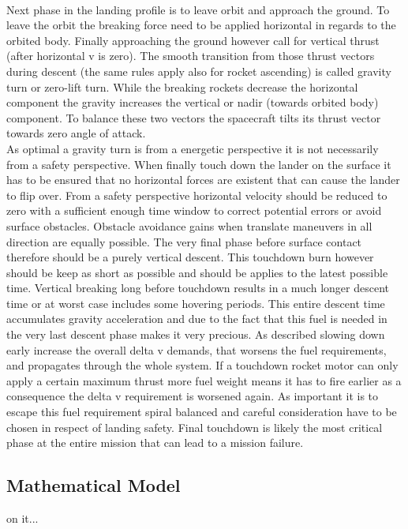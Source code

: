 \\
Next phase in the landing profile is to leave orbit and approach the ground. To leave the orbit the breaking force need to be applied horizontal in regards to the orbited body. Finally approaching the ground however call for vertical thrust (after horizontal v is zero). The smooth transition from those thrust vectors during descent (the same rules apply also for rocket ascending)  is called gravity turn or zero-lift turn. While the breaking rockets decrease the horizontal component the gravity increases the vertical or nadir (towards orbited body) component. To balance these two vectors the spacecraft tilts its thrust vector towards zero angle of attack.\\
As optimal a gravity turn is from a energetic perspective it is not necessarily from a safety perspective. When finally touch down the lander on the surface it has to be ensured that no horizontal forces are existent that can cause the lander to flip over. From a safety perspective horizontal velocity should be reduced to zero with a sufficient enough time window to correct potential errors or avoid surface obstacles. Obstacle avoidance gains when translate maneuvers in all direction are equally possible. The very final phase before surface contact therefore should be a purely vertical descent. This touchdown burn however should be keep as short as possible and should be applies to the latest possible time. Vertical breaking long before touchdown results in a much longer descent time or at worst case includes some hovering periods. This entire descent time accumulates gravity acceleration and due to the fact that this fuel is needed in the very last descent phase makes it very precious. As described slowing down early increase the overall delta v demands, that worsens the fuel requirements, and propagates through the whole system. If a touchdown rocket motor can only apply a certain maximum thrust more fuel weight means it has to fire earlier as a consequence the delta v requirement is worsened again. As important it is to escape this fuel requirement spiral balanced and careful consideration have to be chosen in respect of landing safety. Final touchdown is likely the most critical phase at the entire mission that can lead to a mission failure.\\

\subsection{Mathematical Model}
on it...